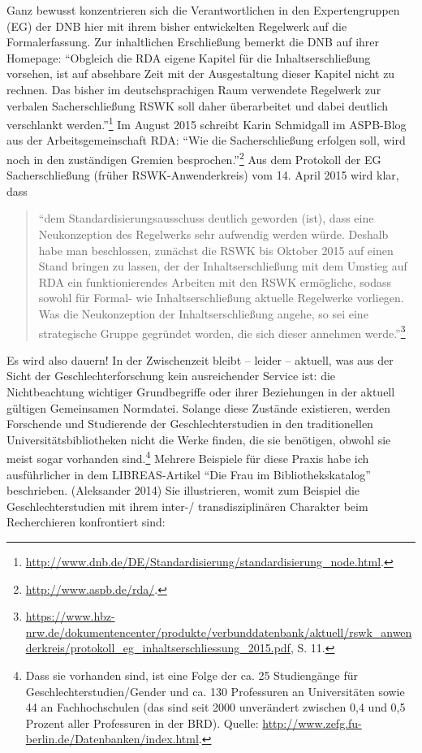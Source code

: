 Ganz bewusst konzentrieren sich die Verantwortlichen in den
Expertengruppen (EG) der DNB hier mit ihrem bisher entwickelten
Regelwerk auf die Formalerfassung. Zur inhaltlichen Erschließung bemerkt
die DNB auf ihrer Homepage: \enquote{Obgleich die RDA eigene Kapitel für
die Inhaltserschließung vorsehen, ist auf absehbare Zeit mit der
Ausgestaltung dieser Kapitel nicht zu rechnen. Das bisher im
deutschsprachigen Raum verwendete Regelwerk zur verbalen
Sacherschließung RSWK soll daher überarbeitet und dabei deutlich
verschlankt werden.}\footnote{\url{http://www.dnb.de/DE/Standardisierung/standardisierung_node.html}.}
Im August 2015 schreibt Karin Schmidgall im ASPB-Blog aus der
Arbeitsgemeinschaft RDA: \enquote{Wie die Sacherschließung erfolgen
soll, wird noch in den zuständigen Gremien besprochen.}\footnote{\url{http://www.aspb.de/rda/}.}
Aus dem Protokoll der EG Sacherschließung (früher RSWK-Anwenderkreis)
vom 14. April 2015 wird klar, dass

\begin{quote}
\enquote{dem Standardisierungsausschuss deutlich geworden (ist), dass
eine Neukonzeption des Regelwerks sehr aufwendig werden würde. Deshalb
habe man beschlossen, zunächst die RSWK bis Oktober 2015 auf einen Stand
bringen zu lassen, der der Inhaltserschließung mit dem Umstieg auf RDA
ein funktionierendes Arbeiten mit den RSWK ermögliche, sodass sowohl für
Formal- wie Inhaltserschließung aktuelle Regelwerke vorliegen. Was die
Neukonzeption der Inhaltserschließung angehe, so sei eine strategische
Gruppe gegründet worden, die sich dieser annehmen werde.}\footnote{\url{https://www.hbz-nrw.de/dokumentencenter/produkte/verbunddatenbank/aktuell/rswk_anwenderkreis/protokoll_eg_inhaltserschliessung_2015.pdf},
  S. 11.}
\end{quote}

Es wird also dauern! In der Zwischenzeit bleibt -- leider -- aktuell,
was aus der Sicht der Geschlechterforschung kein ausreichender Service
ist: die Nichtbeachtung wichtiger Grundbegriffe oder ihrer Beziehungen
in der aktuell gültigen Gemeinsamen Normdatei. Solange diese Zustände
existieren, werden Forschende und Studierende der Geschlechterstudien in
den traditionellen Universitätsbibliotheken nicht die Werke finden, die
sie benötigen, obwohl sie meist sogar vorhanden sind.\footnote{Dass sie
  vorhanden sind, ist eine Folge der ca. 25 Studiengänge für
  Geschlechterstudien/Gender und ca. 130 Professuren an Universitäten
  sowie 44 an Fachhochschulen (das sind seit 2000 unverändert zwischen
  0,4 und 0,5 Prozent aller Professuren in der BRD). Quelle:
  \url{http://www.zefg.fu-berlin.de/Datenbanken/index.html}.} Mehrere
Beispiele für diese Praxis habe ich ausführlicher in dem LIBREAS-Artikel
\enquote{Die Frau im Bibliothekskatalog} beschrieben. (Aleksander 2014)
Sie illustrieren, womit zum Beispiel die Geschlechterstudien mit ihrem
inter-/ transdisziplinären Charakter beim Recherchieren konfrontiert
sind:

